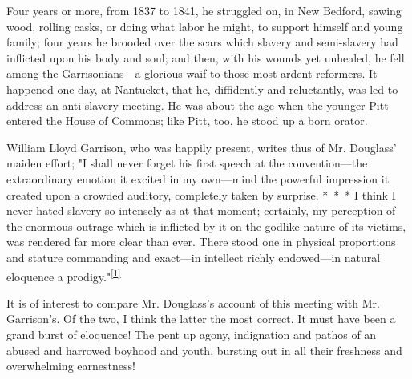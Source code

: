 Four years or more, from 1837 to 1841, he struggled on, in New Bedford,
sawing wood, rolling casks, or doing what labor he might, to support
himself and young family; four years he brooded over the scars which
slavery and semi-slavery had inflicted upon his body and soul; and then,
with his wounds yet unhealed, he fell among the Garrisonians---a
glorious waif to those most ardent reformers. It happened one day, at
Nantucket, that he, diffidently and reluctantly, was led to address an
anti-slavery meeting. He was about the age when the younger Pitt entered
the House of Commons; like Pitt, too, he stood up a born orator.

William Lloyd Garrison, who was happily present, writes thus of Mr.
Douglass' maiden effort; "I shall never forget his first speech at the
convention---the extraordinary emotion it excited in my own---mind the
powerful impression it created upon a crowded auditory, completely taken
by surprise. {*~*~*} I think I never hated slavery so intensely as at
that moment; certainly, my perception of the enormous outrage which is
inflicted by it on the godlike nature of its victims, was rendered far
more clear than ever. There stood one in physical proportions and
stature commanding and exact---in intellect richly endowed---in natural
eloquence a
prodigy."\textsuperscript{\protect\hyperlink{cite_note-1}{{[}1{]}}}

It is of interest to compare Mr. Douglass's account of this meeting with
Mr. Garrison's. Of the two, I think the latter the most correct. It must
have been a grand burst of eloquence! The pent {}up agony, indignation
and pathos of an abused and harrowed boyhood and youth, bursting out in
all their freshness and overwhelming earnestness!

